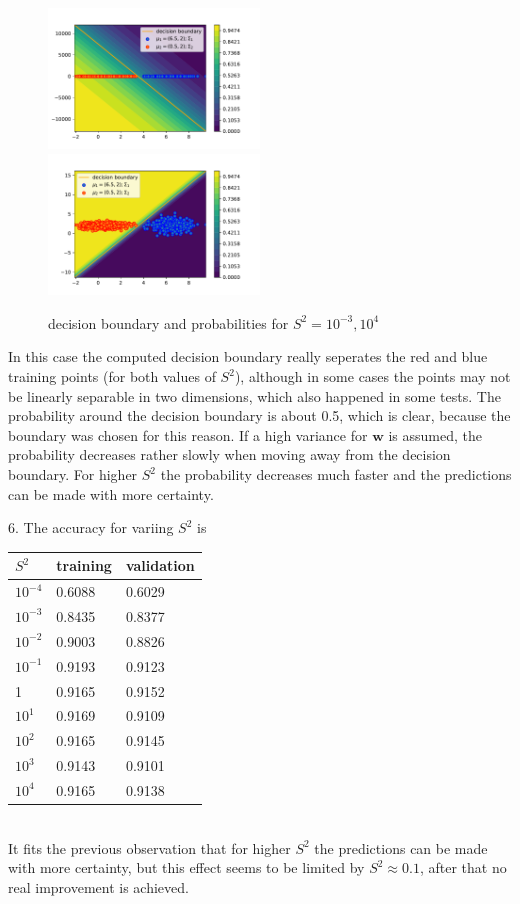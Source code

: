 \documentclass[english]{exercisesheet}
\begin{document}
\begin{solution}
\begin{figure}
 \includegraphics[width=0.5\textwidth]{simulated-1.pdf}
 \includegraphics[width=0.5\textwidth]{simulated-8.pdf}
 \caption{decision boundary and probabilities for $S^2=10^{-3},10^4$}
\end{figure}
In this case the computed decision boundary really seperates the red and blue training points (for both values of $S^2$), although in some cases the points may not be linearly separable in two dimensions, which also happened in some tests. The probability around the decision boundary is about 0.5, which is clear, because the boundary was chosen for this reason. If a high variance for $\bm{w}$ is assumed, the probability decreases rather slowly when moving away from the decision boundary. For higher $S^2$ the probability decreases much faster and the predictions can be made with more certainty.\\
\par 6. The accuracy for variing $S^2$ is
\begin{table}[h]
\begin{tabular}{lll}
 $S^2$&training  &validation\\ \hline
 $10^{-4}$& 0.6088 & 0.6029 \\
 $10^{-3}$& 0.8435 & 0.8377 \\
 $10^{-2}$& 0.9003 & 0.8826 \\
 $10^{-1}$& 0.9193 & 0.9123 \\
 1& 0.9165 & 0.9152 \\
 $10^{1}$& 0.9169 & 0.9109 \\
 $10^{2}$& 0.9165 & 0.9145 \\
 $10^{3}$& 0.9143 & 0.9101 \\
 $10^{4}$& 0.9165 & 0.9138
\end{tabular}
\end{table}\\
It fits the previous observation that for higher $S^2$ the predictions can be made with more certainty, but this effect seems to be limited by $S^2 \approx 0.1$, after that no real improvement is achieved.
\end{solution}

 
\end{document}
